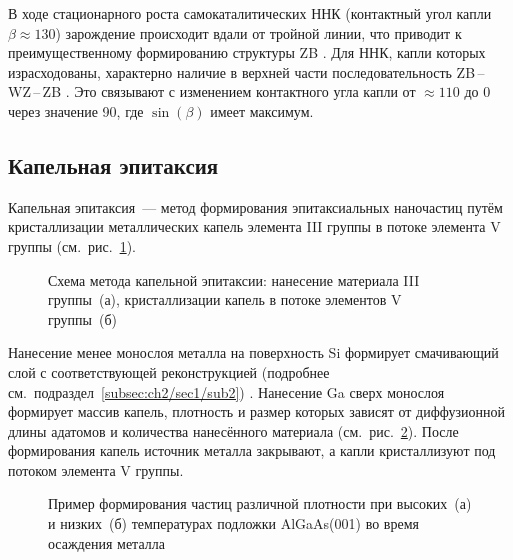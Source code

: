 В ходе стационарного роста самокаталитических ННК (контактный угол капли
\(\beta\approx 130\){\textdegree}) зарождение происходит вдали от тройной
линии, что приводит к преимущественному формированию структуры ZB
\cite{Cirlin2010}. Для ННК, капли которых израсходованы, характерно наличие в
верхней части последовательность ZB\,--\,WZ\,--\,ZB \cite{Spirkoska2009,
Ambrosini2011}. Это связывают с изменением контактного угла капли от \(\approx
110\){\textdegree} до 0{\textdegree} через значение 90{\textdegree}, где
\(\sin(\beta)\) имеет максимум.

\subsection{Капельная эпитаксия}\label{subsec:ch1/sec2/sub6}

Капельная эпитаксия~--- метод формирования эпитаксиальных наночастиц путём
кристаллизации металлических капель элемента III группы в потоке элемента V
группы (см.~рис.~\cref{fig:Image_8_1}).

\begin{figure}[ht]  \caption{Схема
			метода капельной эпитаксии: нанесение материала III группы~(а),
		кристаллизации капель в потоке элементов V группы~(б)
	\cite{Gurioli2019}}\label{fig:Image_8_1} \end{figure}

Нанесение менее монослоя металла на поверхность Si формирует смачивающий слой с
соответствующей реконструкцией (подробнее
см.~подраздел~\cref{subsec:ch2/sec1/sub2}) \cite{Park1988}. Нанесение Ga сверх
монослоя формирует массив капель, плотность и размер которых зависят от
диффузионной длины адатомов и количества нанесённого материала
(см.~рис.~\cref{fig:Image_8_2}). После формирования капель источник металла
закрывают, а капли кристаллизуют под потоком элемента V группы.

\begin{figure}[ht]  \caption{Пример
			формирования частиц различной плотности при высоких~(а) и низких~(б)
			температурах подложки AlGaAs(001) во время осаждения металла
	\cite{Gurioli2019}}\label{fig:Image_8_2} \end{figure}

